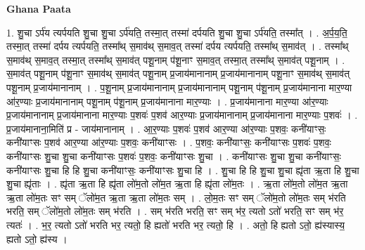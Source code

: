 \documentclass[17pt]{extarticle}
\begin{document}
\textbf{Ghana Paata } \newline

1. शु॒चा ऽर्प॑य त्यर्पयति शु॒चा शु॒चा ऽर्प॑यति॒ तस्मा॒त् तस्मा॑ दर्पयति शु॒चा शु॒चा ऽर्प॑यति॒ तस्मा᳚त् । . अ॒र्प॒य॒ति॒ तस्मा॒त् तस्मा॑ दर्पय त्यर्पयति॒ तस्मा᳚थ् स॒माव॑थ् स॒माव॒त् तस्मा॑ दर्पय त्यर्पयति॒ तस्मा᳚थ् स॒माव॑त् । . तस्मा᳚थ् स॒माव॑थ् स॒माव॒त् तस्मा॒त् तस्मा᳚थ् स॒माव॑त् पशू॒नाम् प॑शू॒नाꣳ स॒माव॒त् तस्मा॒त् तस्मा᳚थ् स॒माव॑त् पशू॒नाम् । . स॒माव॑त् पशू॒नाम् प॑शू॒नाꣳ स॒माव॑थ् स॒माव॑त् पशू॒नाम् प्र॒जाय॑मानानाम् प्र॒जाय॑मानानाम् पशू॒नाꣳ स॒माव॑थ् स॒माव॑त् पशू॒नाम् प्र॒जाय॑मानानाम् । . प॒शू॒नाम् प्र॒जाय॑मानानाम् प्र॒जाय॑मानानाम् पशू॒नाम् प॑शू॒नाम् प्र॒जाय॑मानाना मार॒ण्या आ॑र॒ण्याः प्र॒जाय॑मानानाम् पशू॒नाम् प॑शू॒नाम् प्र॒जाय॑मानाना मार॒ण्याः । . प्र॒जाय॑मानाना मार॒ण्या आ॑र॒ण्याः प्र॒जाय॑मानानाम् प्र॒जाय॑मानाना मार॒ण्याः प॒शवः॑ प॒शव॑ आर॒ण्याः प्र॒जाय॑मानानाम् प्र॒जाय॑मानाना मार॒ण्याः प॒शवः॑ । . प्र॒जाय॑मानाना॒मिति॑ प्र - जाय॑मानानाम् । . आ॒र॒ण्याः प॒शवः॑ प॒शव॑ आर॒ण्या आ॑र॒ण्याः प॒शवः॒ कनी॑याꣳसः॒ कनी॑याꣳसः प॒शव॑ आर॒ण्या आ॑र॒ण्याः प॒शवः॒ कनी॑याꣳसः । . प॒शवः॒ कनी॑याꣳसः॒ कनी॑याꣳसः प॒शवः॑ प॒शवः॒ कनी॑याꣳसः शु॒चा शु॒चा कनी॑याꣳसः प॒शवः॑ प॒शवः॒ कनी॑याꣳसः शु॒चा । . कनी॑याꣳसः शु॒चा शु॒चा कनी॑याꣳसः॒ कनी॑याꣳसः शु॒चा हि हि शु॒चा कनी॑याꣳसः॒ कनी॑याꣳसः शु॒चा हि । . शु॒चा हि हि शु॒चा शु॒चा ह्यृ॑ता ऋ॒ता हि शु॒चा शु॒चा ह्यृ॑ताः । . ह्यृ॑ता ऋ॒ता हि ह्यृ॑ता लो॑म॒तो लो॑म॒त ऋ॒ता हि ह्यृ॑ता लो॑म॒तः । . ऋ॒ता लो॑म॒तो लो॑म॒त ऋ॒ता ऋ॒ता लो॑म॒तः सꣳ सम् ॅलो॑म॒त ऋ॒ता ऋ॒ता लो॑म॒तः सम् । . लो॒म॒तः सꣳ सम् ॅलो॑म॒तो लो॑म॒तः सम् भ॑रति भरति॒ सम् ॅलो॑म॒तो लो॑म॒तः सम् भ॑रति । . सम् भ॑रति भरति॒ सꣳ सम् भ॑र॒ त्यतो ऽतो॑ भरति॒ सꣳ सम् भ॑र॒ त्यतः॑ । . भ॒र॒ त्यतो ऽतो॑ भरति भर॒ त्यतो॒ हि ह्यतो॑ भरति भर॒ त्यतो॒ हि । . अतो॒ हि ह्यतो ऽतो॒ ह्य॑स्यास्य॒ ह्यतो ऽतो॒ ह्य॑स्य । \newline
\end{document}
